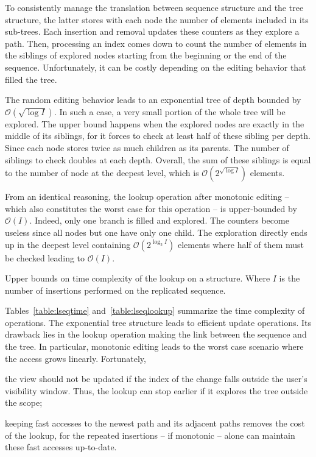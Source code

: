 To consistently manage the translation between sequence structure and the tree
structure, the latter stores with each node the number of elements included in
its sub-trees. Each insertion and removal updates these counters as they explore
a path. Then, processing an index comes down to count the number of elements in
the siblings of explored nodes starting from the beginning or the end of the
sequence. Unfortunately, it can be costly depending on the editing behavior that
filled the tree.

The random editing behavior leads to an exponential tree of depth bounded by
$\mathcal{O}(\sqrt{\log I})$. In such a case, a very small portion of the whole
tree will be explored. The upper bound happens when the explored nodes are
exactly in the middle of its siblings, for it forces to check at least half of
these sibling per depth. Since each node stores twice as much children as its
parents. The number of siblings to check doubles at each depth. Overall, the sum
of these siblings is equal to the number of node at the deepest level, which is
$\mathcal{O}(2^{\sqrt{\log I}})$ elements. 

From an identical reasoning, the lookup operation after monotonic editing --
which also constitutes the worst case for this operation -- is upper-bounded by
$\mathcal{O}(I)$. Indeed, only one branch is filled and explored. The counters
become useless since all nodes but one have only one child. The exploration
directly ends up in the deepest level containing $\mathcal{O}(2^{\log_2 I})$
elements where half of them must be checked leading to
$\mathcal{O}(I)$.

\begin{table}
  \vspace{\ABOVETABLES}
  \caption{\label{table:lseqlookup}
    Upper bounds on time complexity of the lookup on a \LSEQ structure.
    Where $I$ is the number of insertions performed on the replicated sequence.}
  \centering
  
  \vspace{-\ABOVETABLES}
\end{table}

Tables~\ref{table:lseqtime} and~\ref{table:lseqlookup} summarize the time
complexity of operations. The exponential tree structure leads to efficient
update operations. Its drawback lies in the lookup operation making the link
between the sequence and the tree. In particular, monotonic editing leads to the
worst case scenario where the access grows linearly. Fortunately,
\begin{inparaenum}[(i)]
\item the view should not be updated if the index of the change falls outside
  the user's visibility window. Thus, the lookup can stop earlier if it explores
  the tree outside the scope;
\item keeping fast accesses to the newest path and its adjacent paths removes
  the cost of the lookup, for the repeated insertions -- if monotonic -- alone
  can maintain these fast accesses up-to-date.
\end{inparaenum}

